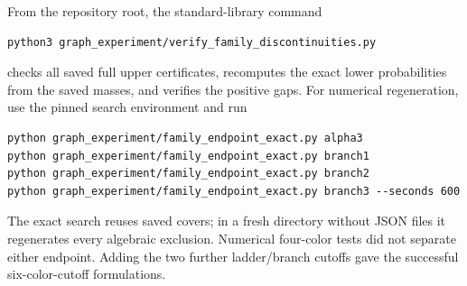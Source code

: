 \documentclass[11pt]{article}
\begin{document}
From the repository root, the standard-library command
\begin{verbatim}
python3 graph_experiment/verify_family_discontinuities.py
\end{verbatim}
checks all saved full upper certificates, recomputes the exact lower
probabilities from the saved masses, and verifies the positive gaps.
For numerical regeneration, use the pinned search environment and run
\begin{verbatim}
python graph_experiment/family_endpoint_exact.py alpha3
python graph_experiment/family_endpoint_exact.py branch1
python graph_experiment/family_endpoint_exact.py branch2
python graph_experiment/family_endpoint_exact.py branch3 --seconds 600
\end{verbatim}
The exact search reuses saved covers; in a fresh directory without JSON
files it regenerates every algebraic exclusion. Numerical four-color
tests did not separate either endpoint. Adding the two further
ladder/branch cutoffs gave the successful six-color-cutoff formulations.
\end{document}
